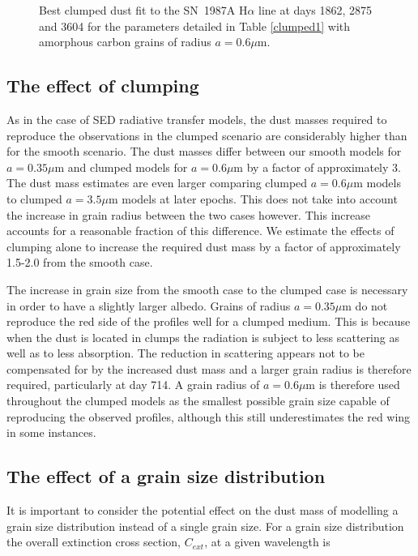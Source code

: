 \documentclass[useAMS,usenatbib,usegraphicx]{mnras}
\begin{document}
\begin{figure}
\caption{Best clumped dust fit to the SN~1987A  H$\alpha$ line at days 1862, 2875 and 
3604 for the parameters detailed in Table \ref{clumped1} with amorphous carbon grains of radius $a=0.6\mu$m.}
\label{d1862_3604_c}

\end{figure}

\subsection{The effect of clumping}


As in the case of SED radiative transfer models, the dust masses required to reproduce the 
observations in the clumped scenario are considerably higher than for the smooth scenario.  The dust masses differ between our smooth models for $a=0.35\mu$m and clumped models for $a=0.6\mu$m by a factor of approximately 3.  The dust mass estimates are even larger comparing clumped $a=0.6\mu$m models to clumped $a=3.5\mu$m models at later epochs. This does not take into account the increase in grain radius between the two cases however.  This increase accounts for a reasonable fraction of this difference. We estimate the effects of clumping alone to increase the required dust mass by a factor of approximately 1.5-2.0 from the smooth case.

The increase in grain size from the smooth case to the clumped case is necessary in order to have a slightly larger albedo.  Grains of radius $a=0.35 \mu$m do not reproduce the red side of the profiles well for a clumped medium.  This is because when 
the dust is located in clumps the radiation is subject to less scattering 
as well as to less absorption.  The reduction in scattering appears not to be 
compensated for by the increased dust mass and a larger grain radius is 
therefore required, particularly at day 714.  A grain radius of $a=0.6\mu$m 
is therefore used throughout the clumped models as the smallest possible 
grain size capable of reproducing the observed profiles, although this still underestimates the red wing in some instances. 




\subsection{The effect of a grain size distribution}
\label{gs_distn}
It is important to consider the potential effect on the dust mass of modelling a grain size distribution instead of a single grain size.  For a grain size distribution the overall extinction cross section, $C_{ext}$, at a given wavelength is 
\end{document}
